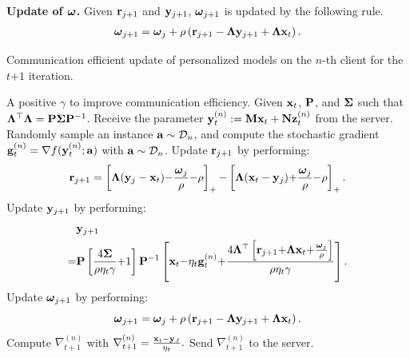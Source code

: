 \documentclass[journal]{IEEEtran}
\begin{document}
\textbf{Update of $\bomega$.} Given $\r_{j+1}$ and $\y_{j+1}$, $\bomega_{j+1}$ is updated by the following rule.
\begin{align}
\nonumber
\bomega_{j+1} = \bomega_j + \rho\lrincir{\r_{j+1} - \bLambda\y_{j+1} + \bLambda\x_t}.
\end{align}

\begin{algorithm}[!]
    \caption{Communication efficient update of personalized models on the $n$-th client for the $t\mathrm{+}1$ iteration.}
    \label{algo_efficient_update_nabla}
    \begin{algorithmic}[1]
        \Require A positive $\gamma$ to improve communication efficiency. Given $\x_t$, $\P$, and $\bSigma$ such that $\bLambda^\top\bLambda = \P\bSigma\P^{-1}$.
        \State Receive the parameter $\y_t^{(n)} := \M\x_t + \N\z_t^{(n)}$ from the server.
        \State Randomly sample an instance $\a\sim\Dcal_n$, and compute the stochastic gradient $\g^{(n)}_t = \nabla f(\y_t^{(n)};\a)$ with $\a\sim\Dcal_n$.
            \State Update $\r_{j+1}$ by performing:
            \begin{align}
            \nonumber
            \r_{j+1} = \left[\bLambda (\y_j - \x_t) \mathrm{-} \frac{\bomega_j}{\rho} \mathrm{-} \rho\right]_\mathrm{+}  \mathrm{-} \left[\bLambda (\x_t - \y_j) \mathrm{+} \frac{\bomega_j}{\rho} \mathrm{-} \rho\right]_\mathrm{+}.
            \end{align}
            \State Update $\y_{j+1}$ by performing:
            \begin{align}
	   \nonumber
	   & \y_{j+1} \\ \nonumber
	   = &\P\left[\frac{4\bSigma}{\rho\eta_t\gamma} \mathrm{+} 1\right]\P^{\mathrm{-1}}\left[\x_t \mathrm{-} \eta_t\g_t^{(n)}\mathrm{+}\frac{4\bLambda^\mathrm{\top}\left[\r_{j+1} \mathrm{+} \bLambda\x_t \mathrm{+} \frac{\bomega_j}{\rho}\right]}{\rho\eta_t\gamma}\right].
	   \end{align} 
           \State Update $\bomega_{j+1}$ by performing:
            $$\bomega_{j+1} = \bomega_j + \rho\lrincir{\r_{j+1} - \bLambda\y_{j+1} + \bLambda\x_t}.$$
            \EndFor
        \State Compute $\nabla_{t+1}^{(n)}$ with $\nabla_{t+1}^{(n)} = \frac{\x_t - \y_J}{\eta_t}.$
        \State Send $\nabla_{t+1}^{(n)}$ to the server.
      \end{algorithmic}
\end{algorithm}
\end{document}
